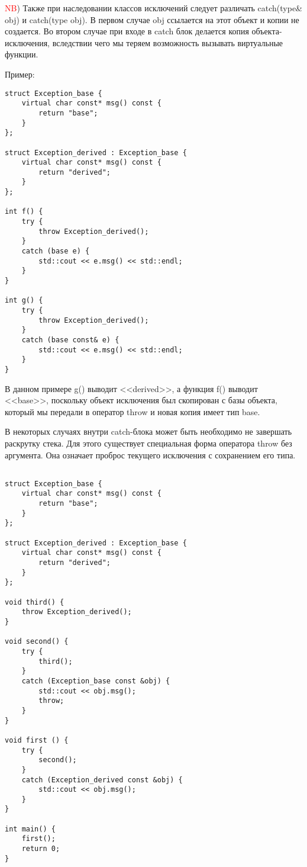 \textcolor{red}{NB}) Также при наследовании классов исключений следует различать catch(type\& obj) и catch(type obj). В первом случае obj ссылается на этот объект и копии не создается. Во втором случае при входе в catch блок делается копия объекта-исключения, вследствии чего мы теряем возможность вызывать виртуальные функции.

Пример:
\begin{verbatim}
struct Exception_base {
    virtual char const* msg() const {
        return "base";
    }
};

struct Exception_derived : Exception_base {
    virtual char const* msg() const {
        return "derived";
    }
};

int f() {
    try {
        throw Exception_derived();
    }
    catch (base e) {
        std::cout << e.msg() << std::endl;
    }
}

int g() {
    try {
        throw Exception_derived();
    }
    catch (base const& e) {
        std::cout << e.msg() << std::endl;
    }
}
\end{verbatim}

В данном примере g() выводит <<derived>>, а функция f() выводит <<base>>, поскольку объект исключения был скопирован с базы объекта, который мы передали в оператор throw и новая копия имеет тип base.

В некоторых случаях внутри catch-блока может быть необходимо не завершать раскрутку стека. Для этого существует специальная форма оператора throw без аргумента. Она означает проброс текущего исключения с сохранением его типа.

\begin{verbatim}

struct Exception_base {
    virtual char const* msg() const {
        return "base";
    }
};

struct Exception_derived : Exception_base {
    virtual char const* msg() const {
        return "derived";
    }
};

void third() {
    throw Exception_derived();
}

void second() {
    try {
        third();
    }
    catch (Exception_base const &obj) {
        std::cout << obj.msg();
        throw;
    }
}

void first () {
    try {
        second();
    }
    catch (Exception_derived const &obj) {
        std::cout << obj.msg();
    }
}

int main() {
    first();
    return 0;
}

\end{verbatim}

